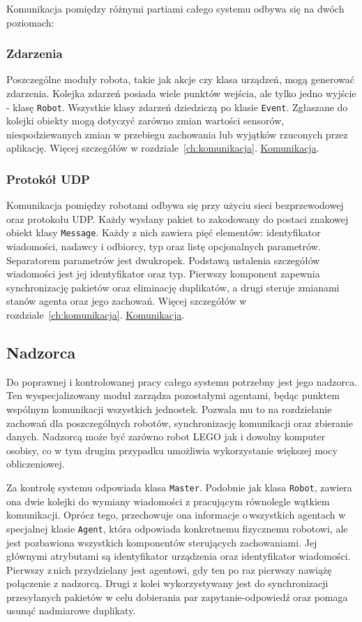 \indent \indent Komunikacja pomiędzy różnymi partiami całego systemu odbywa się na dwóch poziomach:

\subsubsection{Zdarzenia}

Poszczególne moduły robota, takie jak akcje czy klasa urządzeń, mogą generować zdarzenia. Kolejka zdarzeń posiada wiele punktów wejścia, ale tylko jedno wyjście - klasę {\tt Robot}. Wszystkie klasy zdarzeń dziedziczą po klasie {\tt Event}. Zgłaszane do\,kolejki obiekty mogą dotyczyć zarówno zmian wartości sensorów, niespodziewanych zmian w przebiegu zachowania lub wyjątków rzuconych przez aplikację. Więcej szczegółów w rozdziale~\ref{ch:komunikacja}. \hyperref[ch:komunikacja]{Komunikacja}.

\subsubsection{Protokół UDP}

Komunikacja pomiędzy robotami odbywa się przy użyciu sieci bezprzewodowej oraz protokołu UDP. Każdy wysłany pakiet to zakodowany do postaci znakowej obiekt klasy {\tt Message}. Każdy z nich zawiera pięć elementów: identyfikator wiadomości, nadawcy i odbiorcy, typ oraz listę opcjonalnych parametrów. Separatorem parametrów jest dwukropek. Podstawą ustalenia szczegółów wiadomości jest jej identyfikator oraz typ. Pierwszy komponent zapewnia synchronizację pakietów oraz eliminację duplikatów, a drugi steruje zmianami stanów agenta oraz jego zachowań. Więcej szczegółów w rozdziale~\ref{ch:komunikacja}. \hyperref[ch:komunikacja]{Komunikacja}.

\subsection{Nadzorca}

Do poprawnej i kontrolowanej pracy całego systemu potrzebny jest jego nadzorca. Ten wyspecjalizowany moduł zarządza pozostałymi agentami, będąc punktem wspólnym komunikacji wszystkich jednostek. Pozwala mu to na rozdzielanie zachowań dla poszczególnych robotów, synchronizację komunikacji oraz zbieranie danych. Nadzorcą może być zarówno robot LEGO jak i dowolny komputer osobisy, co w tym drugim przypadku umożliwia wykorzystanie większej mocy obliczeniowej.

Za kontrolę systemu odpowiada klasa {\tt Master}. Podobnie jak klasa {\tt Robot}, zawiera ona dwie kolejki do wymiany wiadomości z pracującym równolegle wątkiem komunikacji. Oprócz tego, przechowuje ona informacje o\,wszystkich agentach w\,specjalnej klasie {\tt Agent}, która odpowiada konkretnemu fizycznemu robotowi, ale\,jest pozbawiona wszystkich komponentów sterujących zachowaniami. Jej głównymi atrybutami są identyfikator urządzenia oraz identyfikator wiadomości. Pierwszy z\,nich przydzielany jest agentowi, gdy ten po raz pierwszy nawiążę połączenie z nadzorcą. Drugi z kolei wykorzystywany jest do synchronizacji przesyłanych pakietów w celu dobierania par zapytanie-odpowiedź oraz pomaga usunąć nadmiarowe duplikaty.

